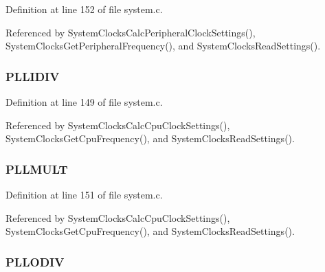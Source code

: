 Definition at line 152 of file system.\-c.



Referenced by System\-Clocks\-Calc\-Peripheral\-Clock\-Settings(), System\-Clocks\-Get\-Peripheral\-Frequency(), and System\-Clocks\-Read\-Settings().

\hypertarget{struct_system_clocks_settings_struct_ae88334ac2f0e997b8360489ee41d830d}{
\subsubsection[{P\-L\-L\-I\-D\-I\-V}]{ P\-L\-L\-I\-D\-I\-V}}\label{struct_system_clocks_settings_struct_ae88334ac2f0e997b8360489ee41d830d}


Definition at line 149 of file system.\-c.



Referenced by System\-Clocks\-Calc\-Cpu\-Clock\-Settings(), System\-Clocks\-Get\-Cpu\-Frequency(), and System\-Clocks\-Read\-Settings().

\hypertarget{struct_system_clocks_settings_struct_ab765b0bda56d0b80ed00487dbe6fd3ad}{
\subsubsection[{P\-L\-L\-M\-U\-L\-T}]{ P\-L\-L\-M\-U\-L\-T}}\label{struct_system_clocks_settings_struct_ab765b0bda56d0b80ed00487dbe6fd3ad}


Definition at line 151 of file system.\-c.



Referenced by System\-Clocks\-Calc\-Cpu\-Clock\-Settings(), System\-Clocks\-Get\-Cpu\-Frequency(), and System\-Clocks\-Read\-Settings().

\hypertarget{struct_system_clocks_settings_struct_a281ef8423a7e781fdb715ba7dca8df4f}{
\subsubsection[{P\-L\-L\-O\-D\-I\-V}]{ P\-L\-L\-O\-D\-I\-V}}\label{struct_system_clocks_settings_struct_a281ef8423a7e781fdb715ba7dca8df4f}


